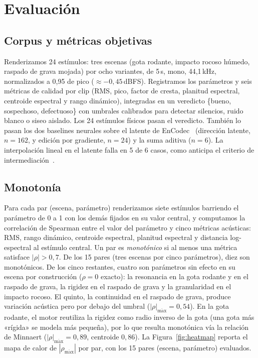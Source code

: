 \documentclass[a4paper,11pt,twoside]{article}
\begin{document}
\section{Evaluación}

\subsection{Corpus y métricas objetivas}

Renderizamos 24 estímulos: tres escenas (gota rodante, impacto rocoso húmedo, raspado de grava mojada) por ocho variantes, de 5\,s, mono, 44,1\,kHz, normalizados a 0,95 de pico ($\approx -0{,}45$\,dBFS). Registramos los parámetros y seis métricas de calidad por clip (RMS, pico, factor de cresta, planitud espectral, centroide espectral y rango dinámico), integradas en un veredicto \{bueno, sospechoso, defectuoso\} con umbrales calibrados para detectar silencios, ruido blanco o siseo aislado. Los 24 estímulos físicos pasan el veredicto. También lo pasan los dos baselines neurales sobre el latente de EnCodec~\cite{defossez2022encodec} (dirección latente, $n=162$, y edición por gradiente, $n=24$) y la suma aditiva ($n=6$). La interpolación lineal en el latente falla en 5 de 6 casos, como anticipa el criterio de intermediación~\cite{niu2024soundmorpher}.

\subsection{Monotonía}
\label{sec:monotonia}

Para cada par (escena, parámetro) renderizamos siete estímulos barriendo el parámetro de 0 a 1 con los demás fijados en su valor central, y computamos la correlación de Spearman entre el valor del parámetro y cinco métricas acústicas: RMS, rango dinámico, centroide espectral, planitud espectral y distancia log-espectral al estímulo central. Un par es \emph{monotónico} si al menos una métrica satisface $|\rho| > 0{,}7$. De los 15 pares (tres escenas por cinco parámetros), diez son monotónicos. De los cinco restantes, cuatro son parámetros sin efecto en su escena por construcción ($\rho = 0$ exacto): la resonancia en la gota rodante y en el raspado de grava, la rigidez en el raspado de grava y la granularidad en el impacto rocoso. El quinto, la continuidad en el raspado de grava, produce variación acústica pero por debajo del umbral ($|\rho|_\mathrm{m\acute{a}x} = 0{,}54$). En la gota rodante, el motor reutiliza la rigidez como radio inverso de la gota (una gota más «rígida» se modela más pequeña), por lo que resulta monotónica vía la relación de Minnaert ($|\rho|_\mathrm{m\acute{a}x} = 0{,}89$, centroide $0{,}86$). La Figura~\ref{fig:heatmap} reporta el mapa de calor de $|\rho_\mathrm{m\acute{a}x}|$ por par, con los 15 pares (escena, parámetro) evaluados.
\end{document}

